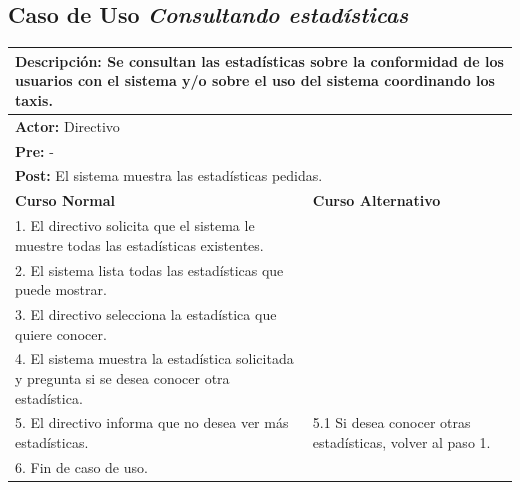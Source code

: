 \documentclass[a4paper]{article}
\begin{document}
\subsection{Caso de Uso \textit{Consultando estad\'isticas}}
\begin{center}
\begin{tabular}{|p{10cm} | p{6cm}|}
\hline
\multicolumn{2}{|p{16cm}|}{\textbf{Descripci\'on:} Se consultan las estad\'isticas sobre la conformidad de los usuarios con el sistema y/o sobre el uso del sistema coordinando los taxis. } \\
\hline
\multicolumn{2}{|l|}{\textbf{Actor:} Directivo } \\
\hline
\multicolumn{2}{|l|}{\textbf{Pre:} - } \\
\hline
\multicolumn{2}{|p{14cm}|}{\textbf{Post:} El sistema muestra las estad\'isticas pedidas. }\\
\hline
\textbf{Curso Normal}  & \textbf{Curso Alternativo} \\ \hline
1. El directivo solicita que el sistema le muestre todas las estad\'isticas existentes. & \\ \hline
2. El sistema lista todas las estad\'isticas que puede mostrar. & \\ \hline
3. El directivo selecciona la estad\'istica que quiere conocer. & \\ \hline
4. El sistema muestra la estad\'istica solicitada y pregunta si se desea conocer otra estad\'istica. &  \\ \hline
5. El directivo informa que no desea ver m\'as estad\'isticas. & 5.1 Si desea conocer otras estad\'isticas, volver al paso 1. \\ \hline
6. Fin de caso de uso. & \\ \hline
\end{tabular}
\end{center}
\end{document}

